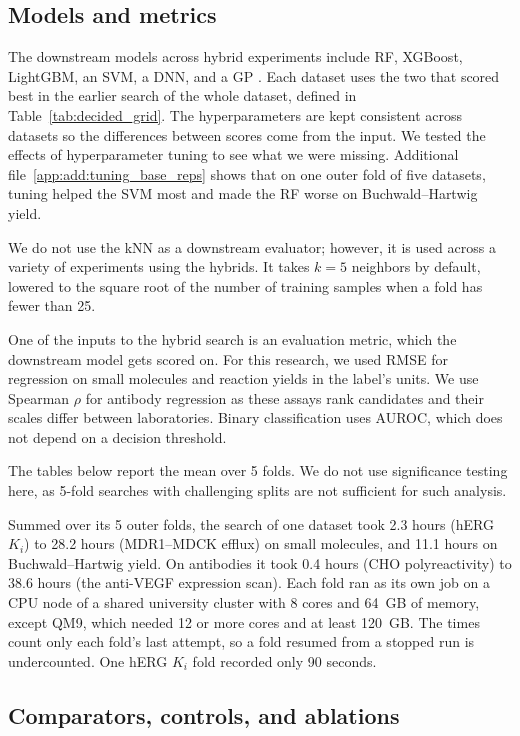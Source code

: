 \subsection{Models and metrics}\label{sec:method:models}

The downstream models across hybrid experiments include RF, XGBoost, LightGBM, an SVM, a DNN, and a GP \citep{Rasmussen2005}. Each dataset uses the two that scored best in the earlier search of the whole dataset, defined in Table~\ref{tab:decided_grid}. The hyperparameters are kept consistent across datasets so the differences between scores come from the input. 
We tested the effects of hyperparameter tuning to see what we were missing. Additional file~\ref{app:add:tuning_base_reps} shows that on one outer fold of five datasets, tuning helped the SVM most and made the RF worse on Buchwald--Hartwig yield.


We do not use the kNN as a downstream evaluator; however, it is used across a variety of experiments using the hybrids. It takes $k = 5$ neighbors by default, lowered to the square root of the number of training samples when a fold has fewer than 25. 

One of the inputs to the hybrid search is an evaluation metric, which the downstream model gets scored on. For this research, we used RMSE for regression on small molecules and reaction yields in the label's units. We use Spearman $\rho$ for antibody regression as these assays rank candidates and their scales differ between laboratories. Binary classification uses AUROC, which does not depend on a decision threshold. 

The tables below report the mean over 5 folds. We do not use significance testing here, as 5-fold searches with challenging splits are not sufficient for such analysis. 

Summed over its 5 outer folds, the search of one dataset took 2.3 hours (hERG $K_i$) to 28.2 hours (MDR1--MDCK efflux) on small molecules, and 11.1 hours on Buchwald--Hartwig yield. On antibodies it took 0.4 hours (CHO polyreactivity) to 38.6 hours (the anti-VEGF expression scan). Each fold ran as its own job on a CPU node of a shared university cluster with 8 cores and 64~GB of memory, except QM9, which needed 12 or more cores and at least 120~GB. The times count only each fold's last attempt, so a fold resumed from a stopped run is undercounted. One hERG $K_i$ fold recorded only 90 seconds.

\subsection{Comparators, controls, and ablations}\label{sec:method:comparators}

